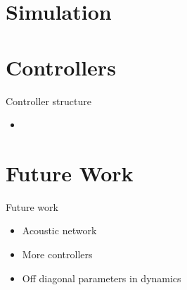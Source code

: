 \documentclass[11pt]{beamer}
\begin{document}
\section{Simulation}
\begin{frame}{}

\end{frame}
\section{Controllers}
\begin{frame}{Controller structure}
\begin{itemize}
\item 
\end{itemize}
\end{frame}
\section{Future Work}
\begin{frame}{Future work}
\begin{itemize}
\item Acoustic network
\item More controllers
\item Off diagonal parameters in dynamics
\end{itemize}
\end{frame}
\end{document}

